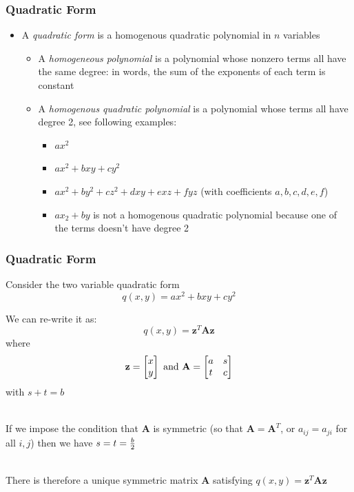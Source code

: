 \documentclass{beamer}
\numberwithin{equation}{section}
\begin{document}
\begin{frame}
\frametitle{Quadratic Form}

\begin{itemize}
\item A \textit{quadratic form} is a homogenous quadratic polynomial in $n$ variables \pause
\begin{itemize}
\item A \textit{homogeneous polynomial} is a polynomial whose nonzero terms all have the same degree: in words, the sum of the exponents of each term is constant \pause
\item A \textit{homogenous quadratic polynomial} is a polynomial whose terms all have degree 2, see following examples: \pause

\begin{itemize}
\item $a x^2$
\item $ax^2+bxy+cy^2$
\item $a x^2+b y^2+c z^2+d xy+e xz+f yz$ (with coefficients $a, b, c, d, e, f$) \pause
\item $a x_{2} + b y$ is not a homogenous quadratic polynomial because one of the terms doesn't have degree 2
\end{itemize}

\end{itemize}

\end{itemize}

\end{frame}



\begin{frame}
\frametitle{Quadratic Form}

Consider the two variable quadratic form
$$q(x, y)=ax^2+bxy+cy^2$$ \pause

We can re-write it as: $$q(x, y)=\mathbf{z}^T\mathbf{A}\mathbf{z}$$ where $$\mathbf{z}=\begin{bmatrix}
x\\y
\end{bmatrix} \hbox{ and }\mathbf{A}=
\begin{bmatrix}
a & s \\
t& c
\end{bmatrix} 
$$
with $s+t=b$ \pause

\ \\If we impose the condition that $\mathbf{A}$ is symmetric (so that $\mathbf{A}=\mathbf{A}^T$, or $a_{ij}=a_{ji}$ for all $i, j$) then we have $s=t={b\over 2}$ \pause
 
 \ \\There is therefore a unique symmetric matrix $\mathbf{A}$ satisfying $q(x, y)=\mathbf{z}^T\mathbf{A}\mathbf{z}$

\end{frame}
\end{document}
